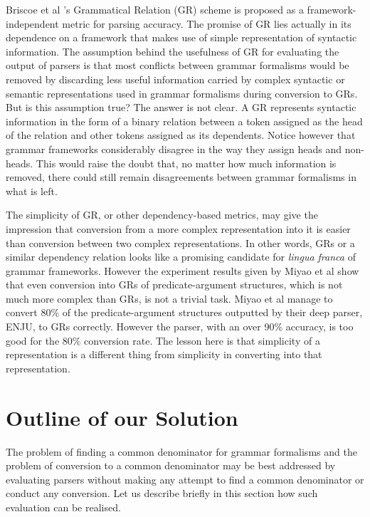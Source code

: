 \documentclass[11pt]{article}
\begin{document}
Briscoe et al 's Grammatical Relation (GR) scheme is proposed as a framework-independent metric for parsing accuracy. The promise of GR lies actually in its dependence on a framework that makes use of simple representation of syntactic information. The assumption behind the usefulness of GR for evaluating the output of parsers %
is that most conflicts between grammar formalisms would be removed by discarding less useful information carried by complex syntactic or semantic representations used in grammar formalisms during conversion to GRs. But is this assumption true? The answer is not clear. A GR represents syntactic information in the form of  a binary relation between a token assigned as the head of the relation and other tokens assigned as its dependents. Notice however that grammar frameworks considerably disagree in the way they assign heads and non-heads. This would raise the doubt that, no matter how much information is removed, there could still remain disagreements between grammar formalisms in what is left.

The simplicity of GR, or other dependency-based metrics, may give the impression that conversion from a more complex representation into it is easier than conversion between two complex representations. In other words, GRs or a similar dependency relation looks like a promising candidate for \emph{lingua franca} of grammar frameworks. However the experiment results given by  Miyao et al  show that even conversion into GRs of predicate-argument structures, which is not much more complex than GRs, is not a trivial task.  Miyao et al  manage to convert 80\% of the predicate-argument structures outputted by their deep parser, ENJU, to GRs correctly. However the parser, with an over 90\% accuracy, is too good for the 80\% conversion rate. The lesson here is that simplicity of a representation is a different thing from simplicity in converting into that representation. 


\section{Outline of our Solution}

The problem of finding a  common denominator for grammar formalisms and the problem of conversion to a common denominator may be best addressed by evaluating parsers without making any attempt to find a common denominator or conduct any conversion. Let us describe briefly in this section how such evaluation can be realised.  
\end{document}
